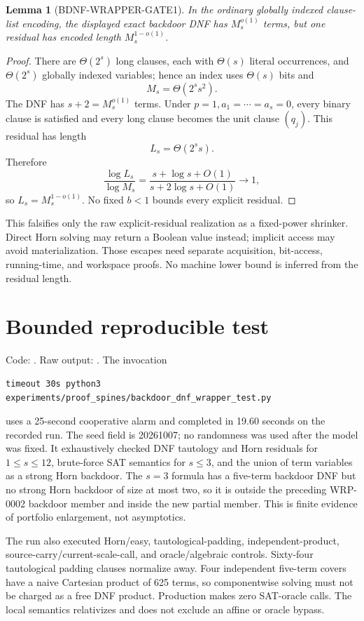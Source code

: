 \documentclass[11pt]{article}
\newtheorem{lemma}{Lemma}
\begin{document}
\begin{lemma}[BDNF-WRAPPER-GATE1]
In the ordinary globally indexed clause-list encoding, the displayed exact
backdoor DNF has $M_s^{o(1)}$ terms, but one residual has encoded length
$M_s^{1-o(1)}$.
\end{lemma}
\begin{proof}
There are $\Theta(2^s)$ long clauses, each with $\Theta(s)$ literal
occurrences, and $\Theta(2^s)$ globally indexed variables; hence an index
uses $\Theta(s)$ bits and
\[
 M_s=\Theta(2^s s^2).
\]
The DNF has $s+2=M_s^{o(1)}$ terms.  Under
$p=1,a_1=\cdots=a_s=0$, every binary clause is satisfied and every long
clause becomes the unit clause $(q_j)$.  This residual has length
\[
 L_s=\Theta(2^s s).
\]
Therefore
\[
 \frac{\log L_s}{\log M_s}
 =\frac{s+\log s+O(1)}{s+2\log s+O(1)}\longrightarrow1,
\]
so $L_s=M_s^{1-o(1)}$.  No fixed $b<1$ bounds every explicit residual.
\end{proof}

This falsifies only the raw explicit-residual realization as a fixed-power
shrinker.  Direct Horn solving may return a Boolean value instead; implicit
access may avoid materialization.  Those escapes need separate acquisition,
bit-access, running-time, and workspace proofs.  No machine lower bound is
inferred from the residual length.

\section*{Bounded reproducible test}
Code:
.  Raw output:
.
The invocation
\begin{verbatim}
timeout 30s python3 experiments/proof_spines/backdoor_dnf_wrapper_test.py
\end{verbatim}
uses a 25-second cooperative alarm and completed in 19.60 seconds on the
recorded run.  The seed field is 20261007; no randomness was used after the
model was fixed.  It exhaustively checked DNF tautology and Horn residuals
for $1\le s\le12$, brute-force SAT semantics for $s\le3$, and the union of
term variables as a strong Horn backdoor.  The $s=3$ formula has a five-term
backdoor DNF but no strong Horn backdoor of size at most two, so it is outside
the preceding WRP-0002 backdoor member and inside the new partial member.
This is finite evidence of portfolio enlargement, not asymptotics.

The run also executed Horn/easy, tautological-padding, independent-product,
source-carry/current-scale-call, and oracle/algebraic controls.  Sixty-four
tautological padding clauses normalize away.  Four independent five-term
covers have a naive Cartesian product of 625 terms, so componentwise solving
must not be charged as a free DNF product.  Production makes zero SAT-oracle
calls.  The local semantics relativizes and does not exclude an affine or
oracle bypass.
\end{document}
